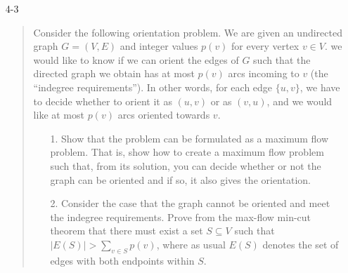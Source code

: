 \documentclass[12pt]{article}
\begin{document}
\begin{enumerate}
\item[4-3]
\begin{quote}
Consider the following orientation problem. We are given an undirected graph $G = (V,E)$ and integer values $p(v)$ for every vertex $v\in V$. we would like to know if we can orient the edges of $G$ such that the directed graph we obtain has at most $p(v)$ arcs incoming to $v$ (the ``indegree requirements''). In other words, for each edge $\{u, v\}$, we
have to decide whether to orient it as $(u, v)$ or as $(v, u)$, and we would like at most $p(v)$ arcs oriented towards $v$.
\begin{itemize}
\item[1.] Show that the problem can be formulated as a maximum flow problem. That is, show how to create a maximum flow problem such that, from its solution, you can decide whether or not the graph can be oriented and if so, it also gives the orientation.
\item[2.] Consider the case that the graph cannot be oriented and meet the indegree requirements. Prove from the max-flow min-cut theorem that there must exist a set $S\subseteq V$ such that $|E(S)|>\sum_{v\in S} p(v)$, where as usual $E(S)$ denotes the set of edges with both endpoints within $S$.
\end{itemize}
\end{quote}


\end{enumerate}
\end{document}

